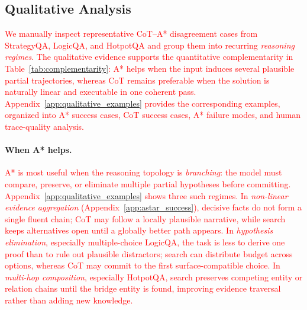\documentclass[11pt]{article}
\begin{document}

\subsection{Qualitative Analysis}
\label{sec:qualitative_conclusions}

\textcolor{red}{We manually inspect representative CoT--A* disagreement cases from StrategyQA, LogicQA, and HotpotQA and group them into recurring \emph{reasoning regimes}. The qualitative evidence supports the quantitative complementarity in Table~\ref{tab:complementarity}: A* helps when the input induces several plausible partial trajectories, whereas CoT remains preferable when the solution is naturally linear and executable in one coherent pass. Appendix~\ref{app:qualitative_examples} provides the corresponding examples, organized into A* success cases, CoT success cases, A* failure modes, and human trace-quality analysis.}

\paragraph{When A* helps.}
\textcolor{red}{A* is most useful when the reasoning topology is \emph{branching}: the model must compare, preserve, or eliminate multiple partial hypotheses before committing. Appendix~\ref{app:qualitative_examples} shows three such regimes. In \emph{non-linear evidence aggregation} (Appendix~\ref{app:astar_success}), decisive facts do not form a single fluent chain; CoT may follow a locally plausible narrative, while search keeps alternatives open until a globally better path appears. In \emph{hypothesis elimination}, especially multiple-choice LogicQA, the task is less to derive one proof than to rule out plausible distractors; search can distribute budget across options, whereas CoT may commit to the first surface-compatible choice. In \emph{multi-hop composition}, especially HotpotQA, search preserves competing entity or relation chains until the bridge entity is found, improving evidence traversal rather than adding new knowledge.}
\end{document}
